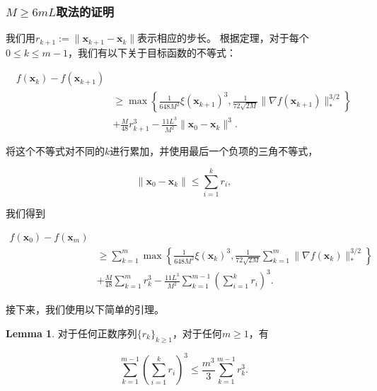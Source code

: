 \documentclass[a4paper,twoside,AutoFakeBold]{article}
\theoremstyle{definition}
\newtheorem{lema2}{{Lemma}}
\begin{document}
\subsubsection{\(M \geq 6mL\)取法的证明}\label{sec:3.1}

我们用\(r_{k+1} := \|\mathbf{x}_{k+1} - \mathbf{x}_k\|\)表示相应的步长。
根据定理，对于每个\(0 \leq k \leq m-1\)，我们有以下关于目标函数的不等式：

\begin{align}
f(\mathbf{x}_k) - f(\mathbf{x}_{k+1}) \\
&\geq \max \left\{ \frac{1}{648M^2} \xi(\mathbf{x}_{k+1})^3, \frac{1}{72\sqrt{2M}} \|\nabla f(\mathbf{x}_{k+1})\|_*^{3/2} \right\} \\
&+ \frac{M}{48} r_{k+1}^3 - \frac{11L^3}{M^2} \|\mathbf{x}_0 - \mathbf{x}_k\|^3. 
\end{align}

将这个不等式对不同的\(k\)进行累加，并使用最后一个负项的三角不等式，

\[
\|\mathbf{x}_0 - \mathbf{x}_k\| \leq \sum_{i=1}^{k} r_i,
\]

我们得到

\begin{align}\label{B.47}
f(\mathbf{x}_0) - f(\mathbf{x}_m) \\
&\geq \sum_{k=1}^{m} \max \left\{ \frac{1}{648M^2} \xi(\mathbf{x}_k)^3, \frac{1}{72\sqrt{2M}} \sum_{k=1}^{m} \|\nabla f(\mathbf{x}_k)\|_*^{3/2} \right\} \\
&+ \frac{M}{48} \sum_{k=1}^{m} r_k^3 - \frac{11L^3}{M^2} \sum_{k=1}^{m-1} \left( \sum_{i=1}^{k} r_i \right)^3. \tag{B.47}
\end{align}

接下来，我们使用以下简单的引理。

\begin{lema2}\label{lema:B.48}
对于任何正数序列\(\{r_k\}_{k \geq 1}\)，对于任何\(m \geq 1\)，有

\[
\sum_{k=1}^{m-1} \left( \sum_{i=1}^{k} r_i \right)^3 \leq \frac{m^3}{3} \sum_{k=1}^{m-1} r_k^3. \tag{B.48}
\]
\end{lema2}
\end{document}
